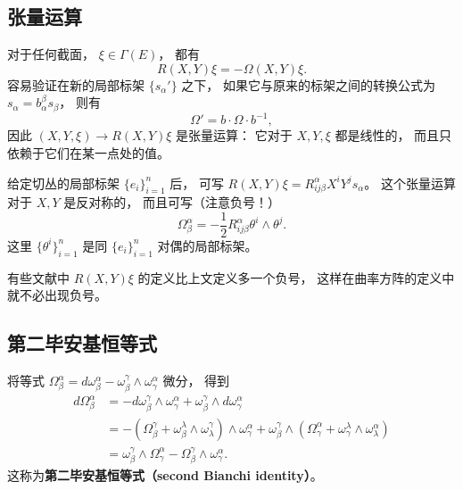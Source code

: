 \subsection{张量运算}
对于任何截面， $\xi\in\Gamma(E)$， 都有
$$
R(X,Y)\xi=-\Omega(X,Y)\xi.
$$
容易验证在新的局部标架 $\{s_\alpha'\}$ 之下， 如果它与原来的标架之间的转换公式为 $s_\alpha=b_\alpha^\beta s_\beta$， 则有
$$
\Omega'=b\cdot\Omega \cdot b^{-1},
$$
因此 $(X,Y,\xi)\to R(X,Y)\xi$ 是张量运算： 它对于 $X,Y,\xi$ 都是线性的， 而且只依赖于它们在某一点处的值。 

给定切丛的局部标架 $\{e_i\}_{i=1}^n$ 后， 可写 $R(X,Y)\xi=R^\alpha_{ij\beta}X^iY^js_\alpha$。 这个张量运算对于 $X,Y$ 是反对称的， 而且可写（注意负号！）
$$
\Omega_\beta^\alpha=-\frac{1}{2}R^\alpha_{ij\beta}\theta^i\wedge\theta^j.
$$
这里 $\{\theta^i\}_{i=1}^n$ 是同 $\{e_i\}_{i=1}^n$ 对偶的局部标架。

有些文献中 $R(X,Y)\xi$ 的定义比上文定义多一个负号， 这样在曲率方阵的定义中就不必出现负号。

\subsection{第二毕安基恒等式}
将等式 $\Omega_\beta^\alpha=d\omega_\beta^\alpha-\omega_\beta^\gamma\wedge\omega_\gamma^\alpha$ 微分， 得到
$$
\begin{aligned}
d\Omega_\beta^\alpha&=-d\omega_\beta^\gamma\wedge\omega_\gamma^\alpha+\omega_\beta^\gamma\wedge d\omega_\gamma^\alpha\\
&=-(\Omega_\beta^\gamma+\omega_\beta^\lambda\wedge\omega_\lambda^\gamma)\wedge\omega_\gamma^\alpha
+\omega_\beta^\gamma\wedge(\Omega_\gamma^\alpha+\omega_\gamma^\lambda\wedge\omega_\lambda^\alpha)\\
&=\omega_\beta^\gamma\wedge\Omega_\gamma^\alpha-\Omega_\beta^\gamma\wedge\omega_\gamma^\alpha.
\end{aligned}
$$
这称为\textbf{第二毕安基恒等式（second Bianchi identity）}。
